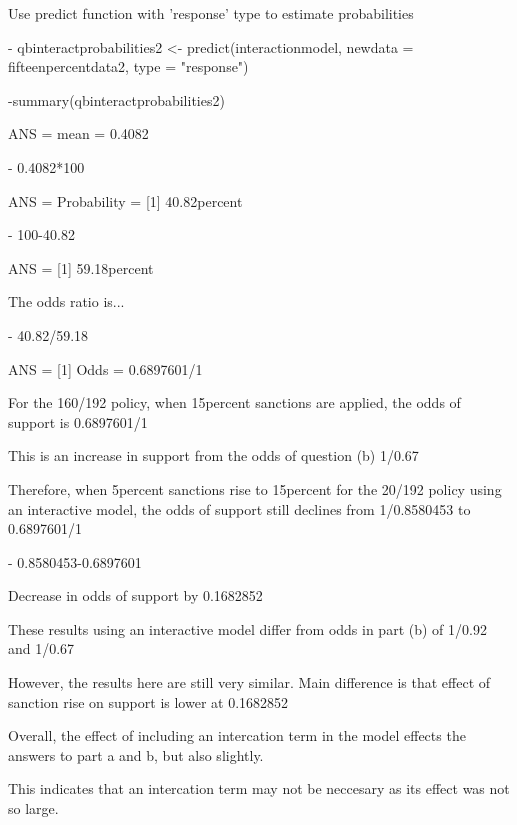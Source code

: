 \documentclass[12pt,letterpaper]{article}
\begin{document}
\begin{enumerate}
\begin{enumerate}
Use predict function with 'response' type to estimate probabilities
	
	- qbinteractprobabilities2 <- predict(interactionmodel, newdata = fifteenpercentdata2, type = "response")
	
	-summary(qbinteractprobabilities2) 
	
	ANS =  mean = 0.4082

	- 0.4082*100 

ANS = Probability = [1] 40.82percent

	- 100-40.82 

ANS = [1] 59.18percent

The odds ratio is...

	- 40.82/59.18 

ANS = [1] Odds = 0.6897601/1 


 For the 160/192 policy, when 15percent sanctions are applied, the odds of support is 0.6897601/1 

This is an increase in support from the odds of question (b) 1/0.67

Therefore, when 5percent sanctions rise to 15percent for the 20/192 policy using an interactive model, the odds of support still declines from 1/0.8580453 to 0.6897601/1 

	- 0.8580453-0.6897601

Decrease in odds of support by 0.1682852

\vspace{1cm}

These results using an interactive model differ from odds in part (b) of 1/0.92 and 1/0.67 

However, the results here are still very similar. Main difference is that effect of sanction rise on support is lower at 0.1682852

\vspace{1cm}

Overall, the effect of including an intercation term in the model effects the answers to part a and b, but also slightly.

This indicates that an intercation term may not be neccesary as its effect was not so large. 




	\end{enumerate}
	\end{enumerate}
\end{document}
